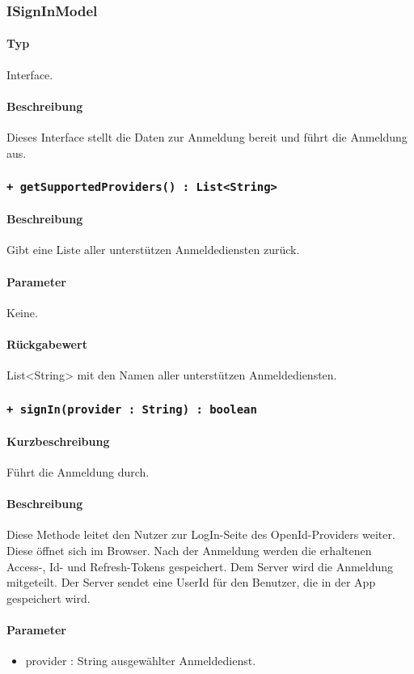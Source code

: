 \subsubsection{ISignInModel}
\paragraph*{Typ}
Interface.
\paragraph*{Beschreibung}
Dieses Interface stellt die Daten zur Anmeldung bereit und führt die Anmeldung aus.

\subsubsection{\texttt{+ getSupportedProviders() : List<String>}}%
\paragraph*{Beschreibung}
Gibt eine Liste aller unterstützen Anmeldediensten zurück.
\paragraph*{Parameter}
Keine.
\paragraph*{Rückgabewert}
List<String> mit den Namen aller unterstützen Anmeldediensten.

\subsubsection{\texttt{+ signIn(provider : String) : boolean}}%
\paragraph*{Kurzbeschreibung}
Führt die Anmeldung durch.
\paragraph*{Beschreibung}
Diese Methode leitet den Nutzer zur LogIn-Seite des OpenId-Providers weiter.
Diese öffnet sich im Browser. Nach der Anmeldung werden die erhaltenen Access-, Id- und Refresh-Tokens gespeichert.
Dem Server wird die Anmeldung mitgeteilt. Der Server sendet eine UserId für den Benutzer, die in der App gespeichert wird.
\paragraph*{Parameter}
\begin{itemize}
    \item provider : String ausgewählter Anmeldedienst.
\end{itemize}
